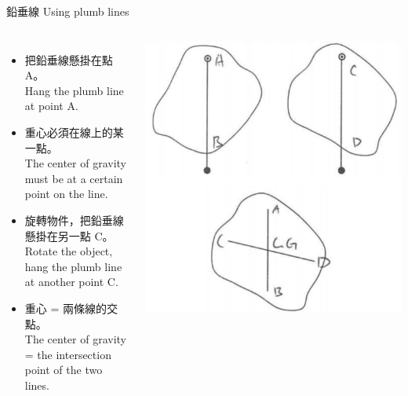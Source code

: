 \documentclass[beamer=true]{standalone}
\begin{document}
\begin{frame}{鉛垂線 Using plumb lines}
    \begin{columns}
        \begin{itemize}
            \item 把鉛垂線懸掛在點 A。\\Hang the plumb line at point A.
            \item 重心必須在線上的某一點。\\The center of gravity must be at a certain point on the line.
            \item 旋轉物件，把鉛垂線懸掛在另一點 C。\\Rotate the object, hang the plumb line at another point C.
            \item 重心 = 兩條線的交點。\\The center of gravity = the intersection point of the two lines.
        \end{itemize}



        {\par\centering
            \includegraphics[width=\textwidth]{assets/85f02607.png}
            \par}
    \end{columns}
\end{frame}
\end{document}
